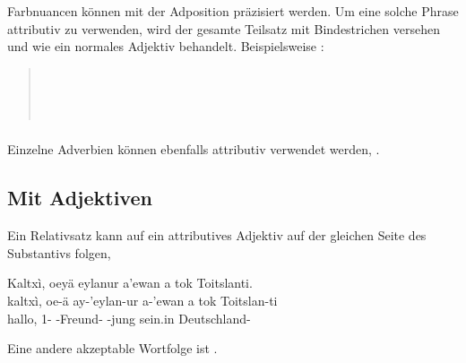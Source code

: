 \subsubsection{} Farbnuancen können mit der Adposition   präzisiert werden. Um eine solche Phrase attributiv zu verwenden, wird der gesamte Teilsatz mit Bindestrichen versehen und wie ein normales Adjektiv behandelt. Beispielsweise  :
\begin{quotation}
	\indent{}\\
	\indent{}\\
	\indent{}\\
	\indent{}
\end{quotation}
\label{syn:attr:na}

\subsubsection{} Einzelne Adverbien können ebenfalls attributiv verwendet werden,  .

\subsection{Mit Adjektiven} 
Ein Relativsatz kann auf ein attributives Adjektiv auf der gleichen Seite des Substantivs folgen,

\begin{interlin}
	\glll Kaltxì, oeyä eylanur a'ewan a tok Toitslanti. \\
	kaltxì, oe-ä ay-'eylan-ur a-'ewan a tok Toitslan-ti \\
	hallo, 1- -Freund- -jung  sein.in Deutschland-\\
	 \Ipawl{}
\end{interlin}

\noindent Eine andere akzeptable Wortfolge ist .

